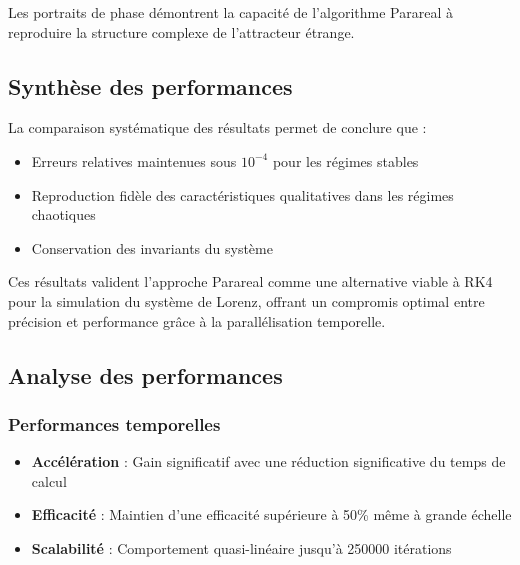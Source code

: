 Les portraits de phase démontrent la capacité de l'algorithme Parareal à reproduire la structure complexe de l'attracteur étrange.

\subsection{Synthèse des performances}

La comparaison systématique des résultats permet de conclure que :

\begin{itemize}
    \item Erreurs relatives maintenues sous $10^{-4}$ pour les régimes stables
    \item Reproduction fidèle des caractéristiques qualitatives dans les régimes chaotiques
    \item Conservation des invariants du système
    
    
\end{itemize}

Ces résultats valident l'approche Parareal comme une alternative viable à RK4 pour la simulation du système de Lorenz, offrant un compromis optimal entre précision et performance grâce à la parallélisation temporelle.

\subsection{Analyse des performances}

\subsubsection{Performances temporelles}
\begin{itemize}
    \item \textbf{Accélération} : Gain significatif avec une réduction significative du temps de calcul
    \item \textbf{Efficacité} : Maintien d'une efficacité supérieure à 50\% même à grande échelle
    \item \textbf{Scalabilité} : Comportement quasi-linéaire jusqu'à 250000 itérations
\end{itemize}

